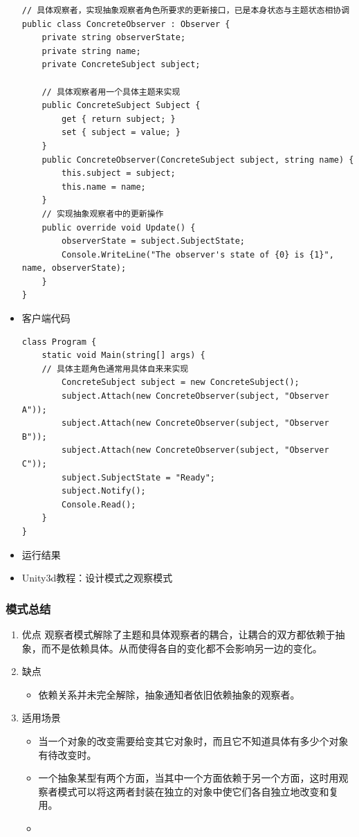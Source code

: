 \documentclass[9pt, b5paper]{article}
\begin{document}
\begin{itemize}
\begin{verbatim}
// 具体观察者，实现抽象观察者角色所要求的更新接口，已是本身状态与主题状态相协调
public class ConcreteObserver : Observer {
    private string observerState;
    private string name;
    private ConcreteSubject subject;
    
	// 具体观察者用一个具体主题来实现
    public ConcreteSubject Subject {
        get { return subject; }
        set { subject = value; }
    }
    public ConcreteObserver(ConcreteSubject subject, string name) {
        this.subject = subject;
        this.name = name;
    }
	// 实现抽象观察者中的更新操作
    public override void Update() {
        observerState = subject.SubjectState;
        Console.WriteLine("The observer's state of {0} is {1}", name, observerState);
    }
}
\end{verbatim}
\item 客户端代码
\begin{verbatim}
class Program {
    static void Main(string[] args) {
	// 具体主题角色通常用具体自来来实现
        ConcreteSubject subject = new ConcreteSubject();
        subject.Attach(new ConcreteObserver(subject, "Observer A"));
        subject.Attach(new ConcreteObserver(subject, "Observer B"));
        subject.Attach(new ConcreteObserver(subject, "Observer C"));
        subject.SubjectState = "Ready";
        subject.Notify();
        Console.Read();
    }
}
\end{verbatim}
\item 运行结果
\item Unity3d教程：设计模式之观察模式
\end{itemize}
\subsubsection{模式总结}
\label{sec:orgdb1b889}
\begin{enumerate}
\item 优点
\label{sec:orgbdf600a}
观察者模式解除了主题和具体观察者的耦合，让耦合的双方都依赖于抽象，而不是依赖具体。从而使得各自的变化都不会影响另一边的变化。
\item 缺点
\label{sec:org696cd50}
\begin{itemize}
\item 依赖关系并未完全解除，抽象通知者依旧依赖抽象的观察者。
\end{itemize}
\item 适用场景
\label{sec:org875caed}
\begin{itemize}
\item 当一个对象的改变需要给变其它对象时，而且它不知道具体有多少个对象有待改变时。
\item 一个抽象某型有两个方面，当其中一个方面依赖于另一个方面，这时用观察者模式可以将这两者封装在独立的对象中使它们各自独立地改变和复用。
\item 
\end{itemize}
\end{enumerate}
\end{document}
